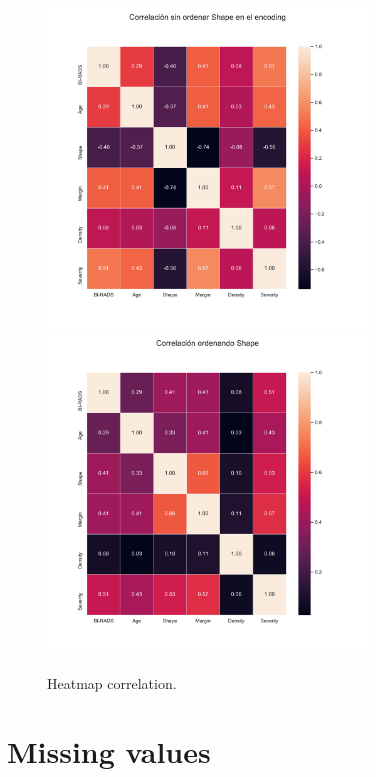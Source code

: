 \documentclass[12pt,twoside]{report}
\begin{document}
\begin{figure}[h]
\begin{multicols}{2}
\includegraphics[width=8.5cm]{./code/figures_python/corr.pdf}%
\columnbreak
\includegraphics[width=8.5cm]{./code/figures_python/corr_shape_ordered.pdf}%
\end{multicols}
\caption{Heatmap correlation.}
\label{heatmap}
\end{figure}
\vspace{5cm}

\section*{Missing values}
\end{document}

